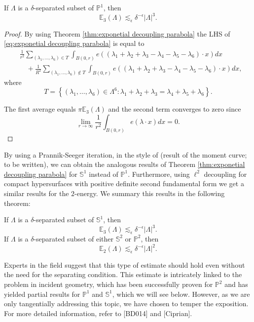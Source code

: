 \begin{thm}
 If $\Lambda$ is a $\delta$-separated subset of $\mathbb{P}^1$, then
\begin{equation*}
\mathbb{E}_3(\Lambda) \lesssim_\epsilon \delta^{-\epsilon}|\Lambda|^3 .
\end{equation*}
\end{thm}
\begin{proof}
By using Theorem \ref{thm:exponetial decoupling parabola} the LHS of \ref{eq:exponetial decoupling parabola} is equal to
$$
\begin{aligned}
& \frac{1}{r^2} \sum_{\left(\lambda_1, \ldots, \lambda_6\right) \in T} \int_{B(0, r)} e\left(\left(\lambda_1+\lambda_2+\lambda_3-\lambda_4-\lambda_5-\lambda_6\right) \cdot x\right) d x \\
& \quad+\frac{1}{R^2} \sum_{\left(\lambda_1, \ldots, \lambda_6\right) \notin T} \int_{B(0, r)} e\left(\left(\lambda_1+\lambda_2+\lambda_3-\lambda_4-\lambda_5-\lambda_6\right) \cdot x\right) d x,
\end{aligned}
$$
where
$$
T=\left\{\left(\lambda_1, \ldots, \lambda_6\right) \in \Lambda^6: \lambda_1+\lambda_2+\lambda_3=\lambda_4+\lambda_5+\lambda_6\right\} .
$$

The first average equals $\pi \mathbb{E}_3(\Lambda)$ and the second term converges to zero since
$$
\lim _{r \rightarrow \infty} \frac{1}{r^2} \int_{B(0, r)} e(\lambda \cdot x) d x=0.
$$
\end{proof}

By using a Prannik-Seeger iteration, in the style of (result of the moment curve; to be written), we can obtain the analogous results of Theorem \ref{thm:exponetial decoupling parabola} for $\mathbb{S}^1$ instead of $\mathbb{P}^1$. Furthermore, using $\ell^2$ decoupling for compact hypersurfaces with positive definite second fundamental form we get a similar results for the $2$-energy. We summary this results in the following theorem:
\begin{thm}\label{thm:separation energy}
If $\Lambda$ is a $\delta$-separated subset of $\mathbb{S}^1$, then
$$
\mathbb{E}_3(\Lambda) \lesssim_\epsilon \delta^{-\epsilon}|\Lambda|^3 .
$$
If $\Lambda$ is a $\delta$-separated subset of either $\mathbb{S}^2$ or $\mathbb{P}^2$, then
$$
\mathbb{E}_2(\Lambda) \lesssim_\epsilon \delta^{-\epsilon}|\Lambda|^2.
$$
\end{thm}
Experts in the field suggest that this type of estimate should hold even without the need for the separating condition. This estimate is intricately linked to the problem in incident geometry, which has been successfully proven for $\mathbb{P}^2$ and has yielded partial results for $\mathbb{P}^1$ and $\mathbb{S}^1$, which we will see below. However, as we are only tangentially addressing this topic, we have chosen to temper the exposition. For more detailed information, refer to [BD014] and [Ciprian].

